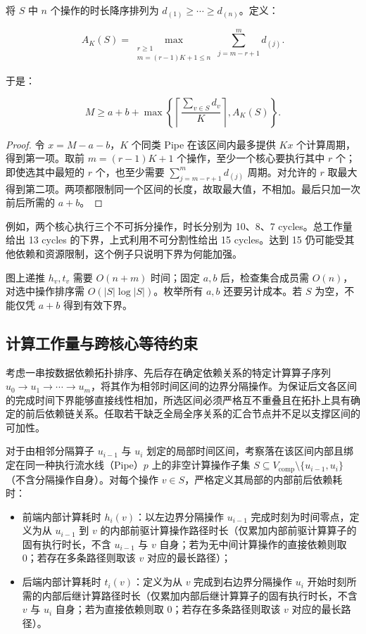\documentclass[anonymous,withtoc]{gmcm2026}
\providecommand{\tightlist}{\setlength{\itemsep}{0pt}\setlength{\parskip}{0pt}}
\begin{document}
将 \(S\) 中 \(n\) 个操作的时长降序排列为 \(d_{(1)} \ge \cdots \ge d_{(n)}\)。定义：

\begin{equation}
A_K(S) = \max_{\substack{r \ge 1 \\ m = (r-1)K+1 \le n}} \sum_{j=m-r+1}^{m} d_{(j)}.
\end{equation}

于是：

\begin{equation}
M \ge a + b + \max\left\{\left\lceil\frac{\sum_{v \in S} d_v}{K}\right\rceil, A_K(S)\right\}.
\end{equation}

\begin{proof} 令 \(x = M - a - b\)，\(K\) 个同类 Pipe 在该区间内最多提供 \(Kx\) 个计算周期，得到第一项。取前 \(m = (r-1)K + 1\) 个操作，至少一个核心要执行其中 \(r\) 个；即使选其中最短的 \(r\) 个，也至少需要 \(\sum_{j=m-r+1}^{m} d_{(j)}\) 周期。对允许的 \(r\) 取最大得到第二项。两项都限制同一个区间的长度，故取最大值，不相加。最后只加一次前后所需的 \(a + b\)。 \end{proof}

例如，两个核心执行三个不可拆分操作，时长分别为 10、8、7 cycles。总工作量给出 13 cycles 的下界，上式利用不可分割性给出 15 cycles。达到 15 仍可能受其他依赖和资源限制，这个例子只说明下界为何能加强。

图上递推 \(h_v, t_v\) 需要 \(O(n + m)\) 时间；固定 \(a, b\) 后，检查集合成员需 \(O(n)\)，对选中操作排序需 \(O(|S| \log |S|)\)。枚举所有 \(a, b\) 还要另计成本。若 \(S\) 为空，不能仅凭 \(a + b\) 得到有效下界。

\subsection{计算工作量与跨核心等待约束}

考虑一串按数据依赖拓扑排序、先后存在确定依赖关系的特定计算算子序列 \(u_0 \to u_1 \to \cdots \to u_m\)，将其作为相邻时间区间的边界分隔操作。为保证后文各区间的完成时间下界能够直接线性相加，所选区间必须严格互不重叠且在拓扑上具有确定的前后依赖链关系。任取若干缺乏全局全序关系的汇合节点并不足以支撑区间的可加性。

对于由相邻分隔算子 \(u_{i-1}\) 与 \(u_i\) 划定的局部时间区间，考察落在该区间内部且绑定在同一种执行流水线（Pipe）\(p\) 上的非空计算操作子集 \(S \subseteq V_{\mathrm{comp}} \setminus \{u_{i-1}, u_i\}\)（不含分隔操作自身）。对每个操作 \(v \in S\)，严格定义其局部的内部前后依赖耗时：

\begin{itemize}
\tightlist
\item
  前端内部计算耗时 \(h_i(v)\)：以左边界分隔操作 \(u_{i-1}\) 完成时刻为时间零点，定义为从 \(u_{i-1}\) 到 \(v\) 的内部前驱计算操作路径时长（仅累加内部前驱计算算子的固有执行时长，不含 \(u_{i-1}\) 与 \(v\) 自身；若为无中间计算操作的直接依赖则取 0；若存在多条路径则取该 \(v\) 对应的最长路径）；
\item
  后端内部计算耗时 \(t_i(v)\)：定义为从 \(v\) 完成到右边界分隔操作 \(u_i\) 开始时刻所需的内部后继计算路径时长（仅累加内部后继计算算子的固有执行时长，不含 \(v\) 与 \(u_i\) 自身；若为直接依赖则取 0；若存在多条路径则取该 \(v\) 对应的最长路径）。
\end{itemize}
\end{document}
